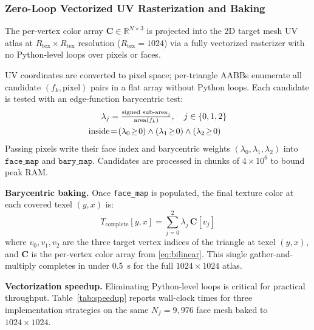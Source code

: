 \documentclass[conference]{IEEEtran}
\newcommand{\R}{\mathbb{R}}
\newcommand{\Tcomplete}{T_{\text{complete}}}
\begin{document}
\subsubsection{Zero-Loop Vectorized UV Rasterization and Baking}
\label{sec:rast}

The per-vertex color array $\mathbf{C} \in \R^{N \times 3}$ is projected into
the 2D target mesh UV atlas at $R_{\text{tex}} \times R_{\text{tex}}$
resolution ($R_{\text{tex}} = 1024$) via a fully vectorized rasterizer with no
Python-level loops over pixels or faces.

UV coordinates are converted to pixel space; per-triangle AABBs enumerate all
candidate $(f_k, \text{pixel})$ pairs in a flat array without Python loops.
Each candidate is tested with an edge-function barycentric test:
\begin{align}
  \lambda_j &= \tfrac{\text{signed sub-area}_j}{\text{area}(f_k)},
  \quad j\in\{0,1,2\} \notag \\
  \text{inside} &\!=\! (\lambda_0 \!\geq\! 0) \wedge (\lambda_1 \!\geq\! 0)
                        \wedge (\lambda_2 \!\geq\! 0)
  \label{eq:edge_test}
\end{align}
Passing pixels write their face index and barycentric weights $(\lambda_0,\lambda_1,\lambda_2)$
into $\texttt{face\_map}$ and $\texttt{bary\_map}$. Candidates are processed in
chunks of $4\times10^6$ to bound peak RAM.

\medskip\noindent\textbf{Barycentric baking.}
Once \texttt{face\_map} is populated, the final texture color at each covered
texel $(y, x)$ is:
\begin{equation}
  \Tcomplete[y,x] = \sum_{j=0}^{2}\lambda_j\,\mathbf{C}[v_j]
  \label{eq:baking_final}
\end{equation}
where $v_0, v_1, v_2$ are the three target vertex indices of the triangle at
texel $(y, x)$, and $\mathbf{C}$ is the per-vertex color array from
\eqref{eq:bilinear}. This single gather-and-multiply completes in under 0.5~s
for the full $1024\!\times\!1024$ atlas.

\medskip\noindent\textbf{Vectorization speedup.}
Eliminating Python-level loops is critical for practical throughput.
Table~\ref{tab:speedup} reports wall-clock times for three implementation
strategies on the same $N_f = 9{,}976$ face mesh baked to $1024\!\times\!1024$.
\end{document}
